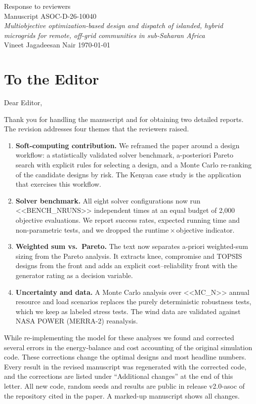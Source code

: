 \documentclass[11pt]{article}
\newcounter{rc}
\begin{document}
\begin{center}
{\Large Response to reviewers}\\[4pt]
Manuscript ASOC-D-26-10040\\
\textit{Multiobjective optimization-based design and dispatch of islanded, hybrid microgrids for remote, off-grid communities in sub-Saharan Africa}\\[4pt]
Vineet Jagadeesan Nair \quad \today
\end{center}

\section*{To the Editor}
Dear Editor,

Thank you for handling the manuscript and for obtaining two detailed reports. The revision addresses four themes that the reviewers raised.
\begin{enumerate}[leftmargin=*,itemsep=2pt]
\item \textbf{Soft-computing contribution.} We reframed the paper around a design workflow: a statistically validated solver benchmark, a-posteriori Pareto search with explicit rules for selecting a design, and a Monte Carlo re-ranking of the candidate designs by risk. The Kenyan case study is the application that exercises this workflow.
\item \textbf{Solver benchmark.} All eight solver configurations now run <<BENCH_NRUNS>> independent times at an equal budget of 2,000 objective evaluations. We report success rates, expected running time and non-parametric tests, and we dropped the runtime\,$\times$\,objective indicator.
\item \textbf{Weighted sum vs.\ Pareto.} The text now separates a-priori weighted-sum sizing from the Pareto analysis. It extracts knee, compromise and TOPSIS designs from the front and adds an explicit cost--reliability front with the generator rating as a decision variable.
\item \textbf{Uncertainty and data.} A Monte Carlo analysis over <<MC_N>> annual resource and load scenarios replaces the purely deterministic robustness tests, which we keep as labeled stress tests. The wind data are validated against NASA POWER (MERRA-2) reanalysis.
\end{enumerate}
While re-implementing the model for these analyses we found and corrected several errors in the energy-balance and cost accounting of the original simulation code. These corrections change the optimal designs and most headline numbers. Every result in the revised manuscript was regenerated with the corrected code, and the corrections are listed under ``Additional changes'' at the end of this letter. All new code, random seeds and results are public in release v2.0-asoc of the repository cited in the paper. A marked-up manuscript shows all changes.
\end{document}

